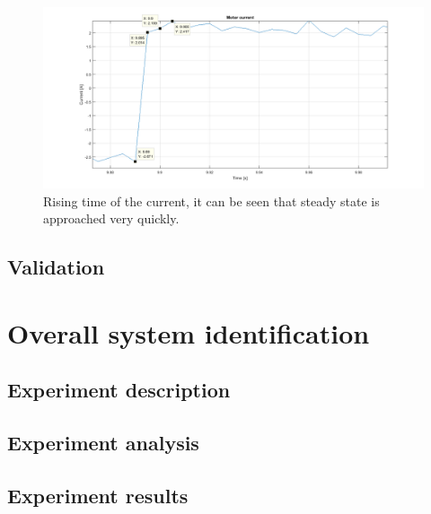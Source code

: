 \begin{figure}[!h]
    \centering
    \includegraphics[width=1\textwidth]{img/motor_id_2.png}
    \caption{Rising time of the current, it can be seen that steady state is approached very quickly.}
    \label{fig:motor_id_2}
\end{figure}
\subsection{Validation}

\section{Overall system identification}
\subsection{Experiment description}
\subsection{Experiment analysis}
\subsection{Experiment results}